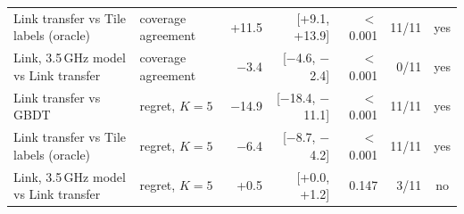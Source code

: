 \begin{tabular}{llrrrrc}
Link transfer vs Tile labels (oracle) & coverage agreement & +11.5 & [+9.1, +13.9] & $<$0.001 & 11/11 & yes \\
Link, 3.5\,GHz model vs Link transfer & coverage agreement & \ensuremath{-}3.4 & [\ensuremath{-}4.6, \ensuremath{-}2.4] & $<$0.001 & 0/11 & yes \\
Link transfer vs GBDT & regret, $K{=}5$ & \ensuremath{-}14.9 & [\ensuremath{-}18.4, \ensuremath{-}11.1] & $<$0.001 & 11/11 & yes \\
Link transfer vs Tile labels (oracle) & regret, $K{=}5$ & \ensuremath{-}6.4 & [\ensuremath{-}8.7, \ensuremath{-}4.2] & $<$0.001 & 11/11 & yes \\
Link, 3.5\,GHz model vs Link transfer & regret, $K{=}5$ & +0.5 & [+0.0, +1.2] & 0.147 & 3/11 & no \\
\bottomrule
\end{tabular}
